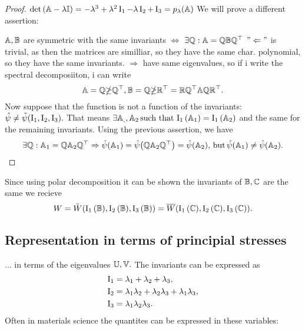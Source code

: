 \documentclass[reqno, a4paper]{article}
\begin{document}
\begin{proof}
    $\det\qty(\mathbb{A}-\lambda \mathbb{I}) = -\lambda^{3} + \lambda^{2} \operatorname{I_1} - \lambda \operatorname{I_2} + \operatorname{I_3} = p_{\lambda}\qty(\mathbb{A})$
    We will prove a different assertion:

    $\mathbb{A}, \mathbb{B}$ are symmetric with the same invariants $\Leftrightarrow$  $\exists \mathbb{Q}: \mathbb{A} = \mathbb{Q} \mathbb{B} \mathbb{Q}^\top$ 
    $"\Leftarrow"$ is trivial, as then the matrices are similliar, so they have the same char. polynomial, so they have the same invariants.
    $\Rightarrow$ have same eigenvalues, so if i write the spectral decomposiiton, i can write
    \[
	    \mathbb{A} = \mathbb{Q} \mathbb{\Lambda} \mathbb{Q}^\top, \mathbb{B} = \mathbb{Q} \mathbb{\Lambda}\mathbb{R}^\top = \mathbb{R}\mathbb{Q}^\top \mathbb{A} \mathbb{Q}\mathbb{R}^\top.
    \]
    Now suppose that the function is not a function of the invariants: $\hat{\psi} \neq \tilde{\psi}\qty(\operatorname{I_1},\operatorname{I_2},\operatorname{I_3}).$ That means $\exists \mathbb{A}_,, \mathbb{A}_2 \, \text{such that} \, \operatorname{I_1}\qty(\mathbb{A}_1) = \operatorname{I_1}\qty(\mathbb{A}_2)$ and the same for the remaining invariants. Using the previous assertion, we have
    \[
	    \exists \mathbb{Q}: \mathbb{A}_1 = \mathbb{Q}\mathbb{A}_2 \mathbb{Q}^\top \Rightarrow \hat{\psi}\qty(\mathbb{A}_1) = \hat{\psi}\qty(\mathbb{Q}\mathbb{A}_2 \mathbb{Q}^\top) = \hat{\psi}\qty(\mathbb{A}_2), \, \text{but} \, \hat{\psi}\qty(\mathbb{A}_1) \neq \hat{\psi}\qty(\mathbb{A}_2).
    \]
\end{proof}
Since using polar decomposition it can be shown the invariants of $\mathbb{B}, \mathbb{C}$ are the same we recieve
\[
	W = \tilde{W}(\operatorname{I_1}\qty(\mathbb{B}), \operatorname{I_2}\qty(\mathbb{B}), \operatorname{I_3}\qty(\mathbb{B})) = \overline{W}\qty(\operatorname{I_1}\qty(\mathbb{C}), \operatorname{I_2}\qty(\mathbb{C}), \operatorname{I_3}\qty(\mathbb{C})).
\]

\subsection{Representation in terms of principial stresses}
\label{sec:representation_principial}
... in terms of the eigenvalues $\mathbb{U},\mathbb{V}.$ The invariants can be expressed as
\begin{align*}
	\operatorname{I_1} &= \lambda_1+\lambda_2 + \lambda_3, \\
	\operatorname{I_2} &= \lambda_1 \lambda_2 + \lambda_2 \lambda_3 + \lambda_1 \lambda_3,\\
	\operatorname{I_3} &= \lambda_1 \lambda_2 \lambda_3.
\end{align*}
Often in materials science the quantites can be expressed in these variables:
\end{document}
